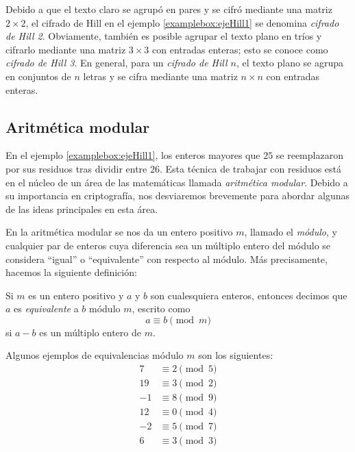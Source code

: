 Debido a que el texto claro se agrupó en pares y se cifró mediante una matriz $2 \times 2$, el cifrado de Hill en el ejemplo \ref{examplebox:ejeHill1} se denomina \emph{cifrado de Hill 2}. Obviamente, también es posible agrupar el texto plano en tríos y cifrarlo mediante una matriz $3 \times 3$ con entradas enteras; esto se conoce como \emph{cifrado de Hill 3}. En general, para un \emph{cifrado de Hill $n$}, el texto plano se agrupa en conjuntos de $n$ letras y se cifra mediante una matriz $n \times n$ con entradas enteras.

\subsection*{Aritmética modular}

En el ejemplo \ref{examplebox:ejeHill1}, los enteros mayores que $25$ se reemplazaron por sus residuos tras dividir entre $26$. Esta técnica de trabajar con residuos está en el núcleo de un área de las matemáticas llamada \emph{aritmética modular}. Debido a su importancia en criptografía, nos desviaremos brevemente para abordar algunas de las ideas principales en esta área.

En la aritmética modular se nos da un entero positivo $m$, llamado el \emph{módulo}, y cualquier par de enteros cuya diferencia sea un múltiplo entero del módulo se considera “igual” o “equivalente” con respecto al módulo. Más precisamente, hacemos la siguiente definición:

\begin{definicion}{}{}
    Si $m$ es un entero positivo y $a$ y $b$ son cualesquiera enteros, entonces decimos que $a$ es \emph{equivalente} a $b$ módulo $m$, escrito como
    $$a \equiv b \pmod{m}$$
    si $a - b$ es un múltiplo entero de $m$.
\end{definicion}

\begin{examplebox}{}{}
    Algunos ejemplos de equivalencias módulo $m$ son los siguientes:
    \begin{align*}
        7 & \equiv 2 \pmod{5} \\
        19 & \equiv 3 \pmod{2} \\ 
        - 1 & \equiv 8 \pmod{9} \\
        12 & \equiv 0 \pmod{4} \\
        -2 & \equiv 5 \pmod{7} \\
        6 & \equiv 3 \pmod{3}
    \end{align*}
\end{examplebox}

